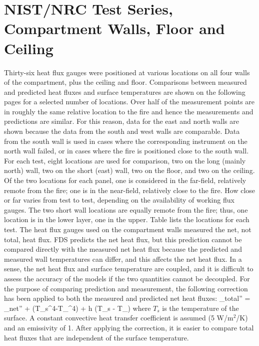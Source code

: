 

\section{NIST/NRC Test Series, Compartment Walls, Floor and Ceiling}

Thirty-six heat flux gauges were positioned at various locations on all four walls of the compartment,
plus the ceiling and floor.  Comparisons between measured and predicted heat fluxes and surface temperatures are shown
on the following pages for a selected number of locations.
Over half of the measurement points are in roughly the same relative location to the fire and hence
the measurements and predictions are similar.  For this reason, data for the east and north walls are shown
because the data from the south and west walls are comparable.  Data from the south wall is used in cases where
the corresponding instrument on the north wall failed, or in cases where the fire is positioned close to the south wall.
For each test, eight locations are used for comparison, two on the long (mainly north) wall,
two on the short (east) wall, two on the floor, and two on the ceiling.  Of the two locations for each panel,
one is considered in the far-field, relatively remote from the fire; one is in the near-field,
relatively close to the fire.  How close or far varies from test to test, depending on the availability of working flux gauges.
The two short wall locations are equally remote from the fire; thus, one location is in the lower layer, one in the upper.
Table lists the locations for each test.
The heat flux gauges used on the compartment walls measured the net, not total, heat flux.
FDS predicts the net heat flux, but this prediction cannot be compared directly with the measured net heat
flux because the predicted and measured wall temperatures can differ, and this affects the net heat flux.
In a sense, the net heat flux and surface temperature are coupled, and it is difficult to assess the accuracy of the models
if the two quantities cannot be decoupled.  For the purpose of comparing prediction and measurement,
the following correction has been applied to both the measured and predicted net heat fluxes:
\be  \dq_{\hbox{\tiny total}}'' = \dq_{\hbox{\tiny net}}'' + \sigma (T_s^4-T_\infty^4) + h (T_s - T_\infty) \ee
where $T_s$ is the temperature of the surface.  A constant convective heat transfer coefficient is assumed
(5 W/m$^2$/K) and an emissivity of 1.
After applying the correction, it is easier to compare total heat fluxes that are independent of the surface temperature.

